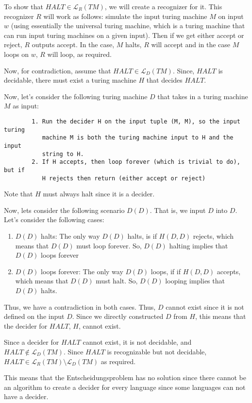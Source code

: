 \documentclass[11pt]{article}
\begin{document}
\begin{enumerate}
    To show that $HALT \in \mathscr{L}_R(TM)$, we will create a recognizer for it. This recognizer $R$ will work as follows: simulate the input turing machine $M$ on input $w$ (using essentially the universal turing machine, which is a turing machine that can run input turing machines on a given input). Then if we get either accept or reject, $R$ outputs accept. In the case, $M$ halts, $R$ will accept and in the case $M$ loops on $w$, $R$ will loop, as required.

    Now, for contradiction, assume that $HALT \in \mathscr{L}_D(TM)$. Since, $HALT$ is decidable, there must exist a turing machine $H$ that decides $HALT$.

    Now, let's consider the following turing machine $D$ that takes in a turing machine $M$ as input:

    \begin{verbatim}
        1. Run the decider H on the input tuple (M, M), so the input turing 
           machine M is both the turing machine input to H and the input 
           string to H.
        2. If H accepts, then loop forever (which is trivial to do), but if 
           H rejects then return (either accept or reject)
    \end{verbatim}

    Note that $H$ must always halt since it is a decider.

    Now, lets consider the following scenario $D(D)$. That is, we input $D$ into $D$. Let's consider the following cases:

    \begin{enumerate}
        \item $D(D)$ halts: The only way $D(D)$ halts, is if $H(D, D)$ rejects, which means that $D(D)$ must loop forever. So, $D(D)$ halting implies that $D(D)$ loops forever
        \item $D(D)$ loops forever: The only way $D(D)$ loops, if if $H(D, D)$ accepts, which means that $D(D)$ must halt. So, $D(D)$ looping implies that $D(D)$ halts.
    \end{enumerate}

    Thus, we have a contradiction in both cases. Thus, $D$ cannot exist since it is not defined on the input $D$. Since we directly constructed $D$ from $H$, this means that the decider for $HALT$, $H$, cannot exist. 

    Since a decider for $HALT$ cannot exist, it is not decidable, and $HALT \notin \mathscr{L}_D(TM)$. 
    Since $HALT$ is recognizable but not decidable, $HALT \in \mathscr{L}_R(TM) \setminus \mathscr{L}_D(TM)$ as required.

    This means that the Entscheidungsproblem has no solution since there cannot be an algorithm to create a decider for every language since some languages can not have a decider.
    \end{enumerate}
\end{document}
